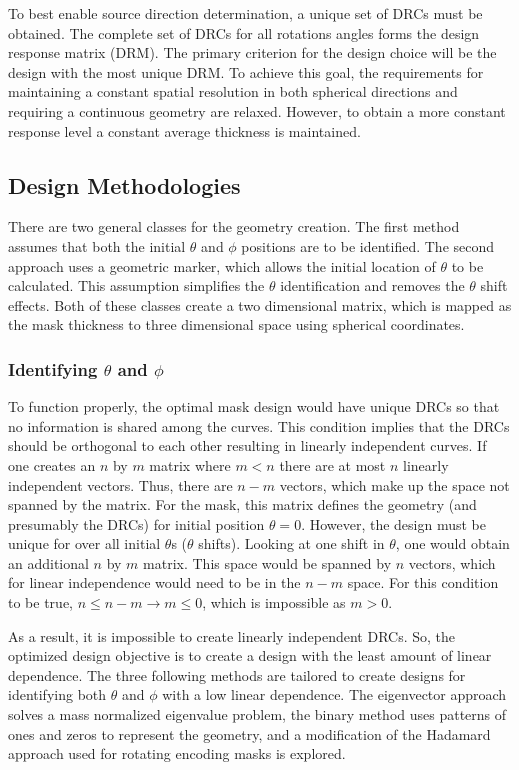 \documentclass[3p,times]{elsarticle}
\begin{document}
To best enable source direction determination, a unique set of DRCs must be obtained. 
The complete set of DRCs for all rotations angles forms the design response matrix (DRM).
The primary criterion for the design choice will be the design with the most unique DRM.  
To achieve this goal, the requirements for maintaining a constant spatial resolution in both spherical directions and requiring a continuous geometry are relaxed.  
However, to obtain a more constant response level a constant average thickness is maintained.  

\subsection{Design Methodologies} \label{design-methods}
There are two general classes for the geometry creation.  
The first method assumes that both the initial $\theta$ and $\phi$ positions are to be identified.  
The second approach uses a geometric marker, which allows the initial location of $\theta$ to be calculated.  
This assumption simplifies the $\theta$ identification and removes the $\theta$ shift effects.  
Both of these classes create a two dimensional matrix, which is mapped as the mask thickness to three dimensional space using spherical coordinates.

\subsubsection{Identifying $\theta$ and $\phi$}
To function properly, the optimal mask design would have unique DRCs so that no information is shared among the curves.  
This condition implies that the DRCs should be orthogonal to each other resulting in linearly independent curves.  
If one creates an $n$ by $m$ matrix where $m<n$ there are at most $n$ linearly independent vectors.  
Thus, there are $n-m$ vectors, which make up the space not spanned by the matrix.  
For the mask, this matrix defines the geometry (and presumably the DRCs) for initial position $\theta=0$.  
However, the design must be unique for over all initial $\theta$s ($\theta$ shifts).  
Looking at one shift in $\theta$, one would obtain an additional $n$ by $m$ matrix.  
This space would be spanned by $n$ vectors, which for linear independence would
need to be in the $n-m$ space.  
For this condition to be true, $n\leq n-m\rightarrow m\leq 0$, which is impossible as $m>0$.

As a result, it is impossible to create linearly independent DRCs.  
So, the optimized design objective is to create a design with the least amount of linear dependence.  
The three following methods are tailored to create designs for identifying both $\theta$ and $\phi$ with a low linear dependence.  
The eigenvector approach solves a mass normalized eigenvalue problem, the binary method uses patterns of ones and zeros to represent the geometry, and a modification of the Hadamard approach used for rotating encoding masks is explored.
\end{document}
